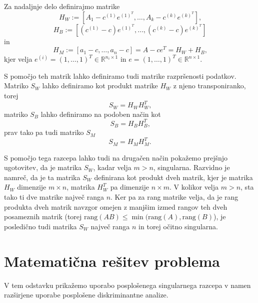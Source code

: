 \documentclass[mat1]{article}
\begin{document}
Za nadaljnje delo definirajmo matrike
$$H_W :=\left[A_1 - c^{(1)}e^{(1)^T}, \ldots, A_k - c^{(k)}e^{(k)^T}\right] \text{,}$$
$$H_B := \left[(c^{(1)} - c)e^{(1)^T}, \ldots,(c^{(k)} - c) e^{(k)^T}\right]$$
in
$$H_M := \left[a_1 - c, \ldots, a_n - c\right] = A - ce^T = H_W + H_B\text{,}$$
kjer velja
$e^{(i)} = (1,\ldots, 1) ^T \in \mathbb{R}^{ n_i \times 1 }$ in $e =  (1,\ldots, 1) ^T \in \mathbb{R}^{ n \times 1 }$.

S pomočjo teh matrik lahko definiramo tudi matrike razpršenosti podatkov. Matriko $S_W$ lahko definiramo kot produkt matrike $H_W$ z njeno transponiranko, torej
$$S_W = H_W H_W^T \text{,}$$
matriko $S_B$ lahko definiramo na podoben način kot
$$S_B = H_B H_B^T \text{,}$$
prav tako pa tudi matriko $S_M$
$$S_M = H_M H_M^T \text{.}$$

S pomočjo tega razcepa lahko tudi na drugačen način pokažemo prejšnjo ugotovitev, da je matrika $S_W$, kadar velja $m>n$, singularna. Razvidno je namreč, da je ta matrika $S_W$ definirana kot produkt dveh matrik, kjer je matrika $H_W$ dimenzije $m \times n$, matrika $H_W^T$ pa dimenzije $n \times m$. V kolikor velja $m>n$, sta tako ti dve matrike največ ranga $n$.
Ker pa za rang matrike velja, da je rang produkta dveh matrik navzgor omejen z manjšim izmed rangov teh dveh posameznih matrik (torej $\text{rang}(AB) \leq \min(\text{rang}(A), \text{rang}(B)$), je posledično tudi matrika $S_W$ največ ranga $n$ in torej očitno singularna.


\section{Matematična rešitev problema}
V tem odstavku prikažemo uporabo posplošenega singularnega razcepa v namen razširjene uporabe posplošene diskriminantne analize.
 
\end{document}
